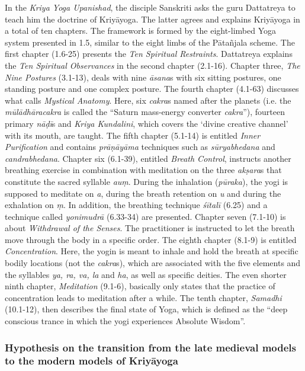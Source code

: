 In the \textit{Kriya Yoga Upanishad}, the disciple Sanskriti asks the guru Dattatreya to teach him the doctrine of Kriyāyoga. The latter agrees and explains Kriyāyoga in a total of ten chapters. The framework is formed by the eight-limbed Yoga system presented in 1.5, similar to the eight limbs of the Pātañjala scheme. The first chapter (1.6-25) presents the \textit{Ten Spiritual Restraints}. Dattatreya explains the \textit{Ten Spiritual Observances} in the second chapter (2.1-16). Chapter three, \textit{The Nine Postures} (3.1-13), deals with nine \textit{āsana}s with six sitting postures, one standing posture and one complex posture. The fourth chapter (4.1-63) discusses what \citeauthor{kriyayogaupanishad1993} calls \textit{Mystical Anatomy}. Here, six \textit{cakra}s named after the planets (i.e. the \textit{mūlādhāracakra} is called the ``Saturn mass-energy converter \textit{cakra}''), fourteen primary \textit{nāḍī}s and \textit{Kriya Kundalini}, which covers the `divine creative channel' with its mouth, are taught. The fifth chapter (5.1-14) is entitled \textit{Inner Purification} and contains \textit{prāṇāyāma} techniques such as \textit{sūryabhedana} and \textit{candrabhedana}. Chapter six (6.1-39), entitled \textit{Breath Control}, instructs another breathing exercise in combination with meditation on the three \textit{akṣara}s that constitute the sacred syllable \textit{auṃ}. During the inhalation (\textit{pūraka}), the yogi is supposed to meditate on \textit{a}, during the breath retention on \textit{u} and during the exhalation on \textit{ṃ}. In addition, the breathing technique \textit{śītalī} (6.25) and a technique called \textit{yonimudrā} (6.33-34) are presented. Chapter seven (7.1-10) is about \textit{Withdrawal of the Senses}. The practitioner is instructed to let the breath move through the body in a specific order. The eighth chapter (8.1-9) is entitled \textit{Concentration}. Here, the yogin is meant to inhale and hold the breath at specific bodily locations (not the \textit{cakra}s), which are associated with the five elements and the syllables \textit{ya, ra, va, la} and \textit {ha}, as well as specific deities. The even shorter ninth chapter, \textit{Meditation} (9.1-6), basically only states that the practice of concentration leads to meditation after a while. The tenth chapter, \textit{Samadhi} (10.1-12), then describes the final state of Yoga, which is defined as the ``deep conscious trance in which the yogi experiences Absolute Wisdom''.

\subsubsection{Hypothesis on the transition from the late medieval models to the modern models of Kriyāyoga}

